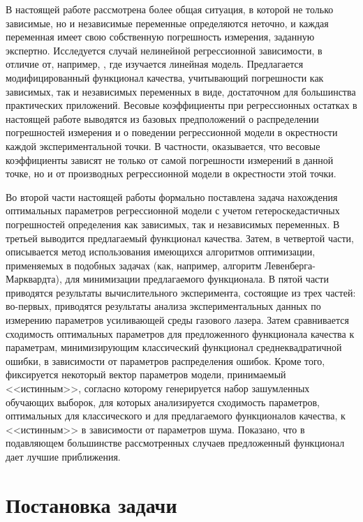 \documentclass[tikz,10pt,a4paper]{article}
\begin{document}
В настоящей работе рассмотрена более общая ситуация, в которой не только зависимые,
но и независимые переменные определяются неточно, и каждая переменная
имеет свою собственную погрешность измерения, заданную экспертно.
Исследуется случай
нелинейной регрессионной зависимости, в отличие от, например,
\cite{kiryati2000heteroscedastic}, где изучается линейная модель.
Предлагается модифицированный функционал качества, учитывающий погрешности как
зависимых, так и независимых переменных в виде, достаточном для большинства
практических приложений. Весовые коэффициенты при регрессионных остатках
в настоящей работе выводятся из базовых предположений о распределении
погрешностей измерения и о поведении регрессионной модели в окрестности каждой
экспериментальной точки. В частности, оказывается, что весовые коэффициенты
зависят не только от самой погрешности измерений в данной точке, но и от
производных регрессионной модели в окрестности этой точки.

Во второй части настоящей работы формально поставлена задача нахождения
оптимальных параметров регрессионной модели с учетом гетероскедастичных
погрешностей определения как зависимых, так и независимых переменных.
В третьей выводится предлагаемый функционал качества.
Затем, в четвертой части, описывается метод использования имеющихся
алгоритмов оптимизации, применяемых в подобных задачах (как, например, алгоритм
Левенберга-Марквардта\cite{Marquardt1963Algorithm}), для минимизации
предлагаемого функционала. В пятой части приводятся результаты
вычислительного эксперимента, состоящие из трех частей: во-первых,
приводятся результаты анализа экспериментальных данных по измерению
параметров усиливающей среды газового лазера. Затем сравнивается сходимость
оптимальных параметров для предложенного функционала качества к параметрам,
минимизирующим классический функционал среднеквадратичной ошибки,
в зависимости от параметров
распределения ошибок. Кроме того, фиксируется некоторый вектор параметров
модели, принимаемый <<истинным>>, согласно которому генерируется набор
зашумленных обучающих выборок, для которых анализируется сходимость параметров,
оптимальных для классического и для предлагаемого функционалов качества,
к <<истинным>> в зависимости от параметров шума. Показано, что в подавляющем большинстве
рассмотренных случаев предложенный функционал дает лучшие приближения.

\section{Постановка задачи}
\end{document}
